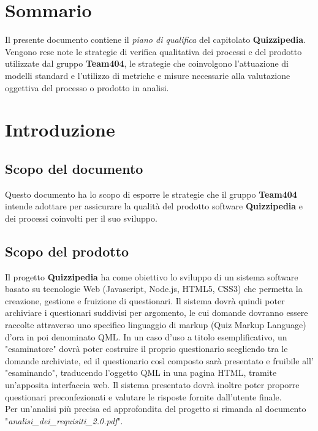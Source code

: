 \documentclass[a4paper,11pt]{article}
\begin{document}
	\newpage
	
	\section*{Sommario}
	Il presente documento contiene il \textit{piano di qualifica} del capitolato \textbf{Quizzipedia}. Vengono rese note le strategie di verifica qualitativa dei processi e del prodotto utilizzate dal gruppo \textbf{Team404}, le strategie che coinvolgono l'attuazione di modelli standard e l'utilizzo di metriche e misure necessarie alla valutazione oggettiva del processo o prodotto in analisi.  
	
	\newpage
	\section{Introduzione}
	\subsection{Scopo del documento}
	Questo documento ha lo scopo di esporre le strategie che il gruppo \textbf{Team404} intende adottare per assicurare la qualità del prodotto software \textbf{Quizzipedia} e dei processi coinvolti per il suo sviluppo.
	
	
	\subsection{Scopo del prodotto}
	Il progetto \textbf{Quizzipedia} ha come obiettivo lo sviluppo di un sistema software basato su tecnologie Web (Javascript\addglos, Node.js\addglos, HTML5\addglos, CSS3\addglos) che permetta la creazione, gestione e fruizione di questionari. Il sistema dovrà quindi poter archiviare i questionari suddivisi per argomento, le cui domande dovranno essere raccolte attraverso uno specifico linguaggio di markup (Quiz Markup Language) d'ora in poi denominato QML\addglos. In un caso d'uso a titolo esemplificativo, un "esaminatore" dovrà poter costruire il proprio questionario scegliendo tra le domande archiviate, ed il questionario così composto sarà presentato e fruibile all' "esaminando", traducendo l'oggetto QML in una pagina HTML\addglos, tramite un'apposita interfaccia web. Il sistema presentato dovrà inoltre poter proporre questionari preconfezionati e valutare le risposte fornite dall'utente finale.
	\\
	Per un'analisi più precisa ed approfondita del progetto si rimanda al documento\\ "\textit{analisi\_dei\_requisiti\_2.0.pdf}".
\end{document}

